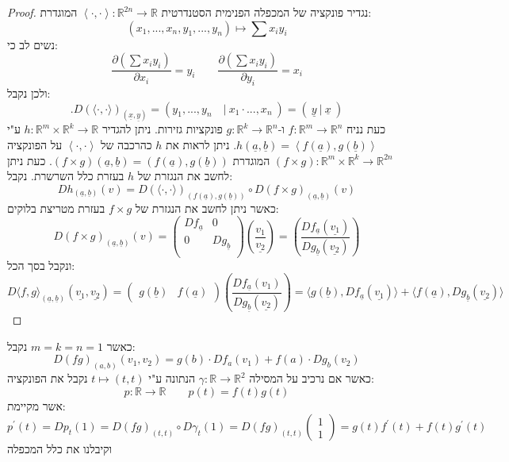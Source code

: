 \documentclass{tstextbook}
\begin{document}
\begin{proof}
נגדיר פונקציה של המכפלה הפנימית הסטנדרטית \(\left\langle  \cdot, \cdot  \right\rangle:\mathbb{R}^{2n}\to\mathbb{R}\) המוגדרת:
$$(x_{1},...,x_{n},y_{1},...,y_{n})\mapsto\sum x_{i}y_{i}$$
נשים לב כי:
$${\frac{\partial\left( \sum x_{i}y_{i} \right)}{\partial x_{i}}}=y_{i} \qquad  {\frac{\partial(\sum x_{i}y_{i})}{\partial y_{i}}}=x_{i}$$
ולכן נקבל:
$$.D(\langle\cdot,\cdot\rangle)_{({\underline{{x}}},{\underline{{y}}})}=\left(y_{1},...,y_{n}\quad{\Big|}~x_{1}\cdot...,x_{n}~\right)=\left(~{\underline{{y}}}~{\Big|}~{\underline{{x}}}~\right)$$
כעת נניח  \(f:\mathbb{R}^m\to \mathbb{R}^n\) ו-\(g:\mathbb{R}^k\to\mathbb{R}^n\) פונקציות גזירות. ניתן להגדיר \(h:\mathbb{R}^m\times \mathbb{R}^k\to \mathbb{R}\) ע"י \(h\left( \underline{a},\underline{b} \right)=\left\langle  f\left( \underline{a} \right), g\left( \underline{b} \right)  \right\rangle\). ניתן לראות את \(h\) כהרכבה של \(\left\langle  \cdot, \cdot  \right\rangle\) על הפונקציה \(\left( f\times g \right):\mathbb{R}^m\times \mathbb{R}^k\to\mathbb{R}^{2n}\) המוגדרת \(\left( f\times g \right)\left( \underline{a},\underline{b} \right)=\left( f\left( \underline{a} \right),g\left( \underline{b} \right) \right)\).
כעת ניתן לחשב את הנגזרת של \(h\) בעזרת כלל השרשרת. נקבל:
$$D h_{(\underline{{{a}}},\underline{{{b}}})}(v)=D(\langle\cdot,\cdot\rangle)_{(f(\underline{{{a}}}),g(\underline{{{b}}}))}\circ D(f\times g)_{(\underline{{{a}}},\underline{{{b}}})}(v)$$
כאשר ניתן לחשב את הנגזרת של \(f\times g\) בעזרת מטריצת בלוקים:
$$ D(f\times g)_{(\underline{a},\underline{b})}(v)=\left(\begin{array}{c|c}Df_{\underline{a}}&0\\\hline0&Dg_{\underline{b}}\\\end{array}\right)\left(\frac{v_{1}}{\underline{v_{2}}}\right)=\left(\frac{Df_{\underline{a}}(\underline{v_{1}})}{Dg_{\underline{b}}(\underline{v_{2}})}\right)$$
ונקבל בסך הכל:
$$ D\langle f,g\rangle_{(\underline{a},\underline{b})}(\underline{v_1},\underline{v_2})=\left(\begin{array}{c|c}g(\underline{b})&f(\underline{a})\end{array}\right)\left(\frac{Df_{\underline{a}}(v_1)}{Dg_{\underline{b}}(\underline{v_2})}\right)=\langle g(\underline{b}),Df_{\underline{a}}(\underline{v_1})\rangle+\langle f(\underline{a}),Dg_{\underline{b}}(\underline{v_2})\rangle $$

\end{proof}
\begin{example}
כאשר \(m=k=n=1\) נקבל:
$$D(f g)_{(a,b)}(v_{1},v_{2})=g(b)\cdot D f_{a}(v_{1})+f(a)\cdot D g_{b}(v_{2})$$
כאשר אם נרכיב על המסילה \(\gamma:\mathbb{R}\to\mathbb{R}^2\) הנתונה ע"י \(t\mapsto(t,t)\) נקבל את הפונקציה:
$$p:\mathbb{R}\to\mathbb{R}\qquad p(t)=f(t)g(t)$$
אשר מקיימת:
$$p^{\prime}(t)=D p_{t}(1)=D(f g)_{(t,t)}\circ D\gamma_{t}(1)=D(f g)_{(t,t)}\left(\begin{array}{l}{{1}}\\ {{1}}\end{array}\right)=g(t)f^{\prime}(t)+f(t)g^{\prime}(t)$$
וקיבלנו את כלל המכפלה

\end{example}
\end{document}
